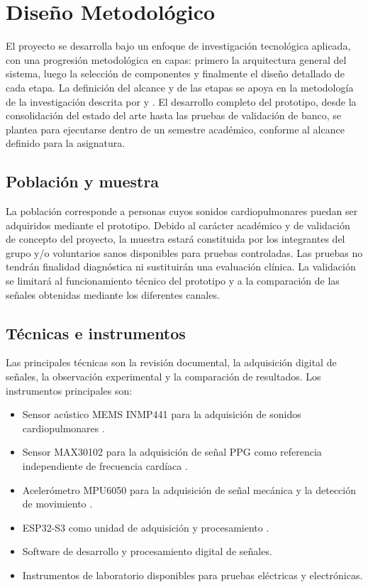 \chapter{Diseño Metodológico}\label{metod}

El proyecto se desarrolla bajo un enfoque de investigación tecnológica aplicada, con una progresión metodológica en capas: primero la arquitectura general del sistema, luego la selección de componentes y finalmente el diseño detallado de cada etapa. La definición del alcance y de las etapas se apoya en la metodología de la investigación descrita por  y . El desarrollo completo del prototipo, desde la consolidación del estado del arte hasta las pruebas de validación de banco, se plantea para ejecutarse dentro de un semestre académico, conforme al alcance definido para la asignatura.

\section{Población y muestra}

La población corresponde a personas cuyos sonidos cardiopulmonares puedan ser adquiridos mediante el prototipo. Debido al carácter académico y de validación de concepto del proyecto, la muestra estará constituida por los integrantes del grupo y/o voluntarios sanos disponibles para pruebas controladas. Las pruebas no tendrán finalidad diagnóstica ni sustituirán una evaluación clínica. La validación se limitará al funcionamiento técnico del prototipo y a la comparación de las señales obtenidas mediante los diferentes canales.

\section{Técnicas e instrumentos}\label{objetivo1}

Las principales técnicas son la revisión documental, la adquisición digital de señales, la observación experimental y la comparación de resultados. Los instrumentos principales son:

\begin{itemize}
    \item Sensor acústico MEMS INMP441 para la adquisición de sonidos cardiopulmonares \cite{INMP441}.
    \item Sensor MAX30102 para la adquisición de señal PPG como referencia independiente de frecuencia cardíaca \cite{MAX30102}.
    \item Acelerómetro MPU6050 para la adquisición de señal mecánica y la detección de movimiento \cite{MPU6050}.
    \item ESP32-S3 como unidad de adquisición y procesamiento \cite{ESP32S3}.
    \item Software de desarrollo y procesamiento digital de señales.
    \item Instrumentos de laboratorio disponibles para pruebas eléctricas y electrónicas.
\end{itemize}

